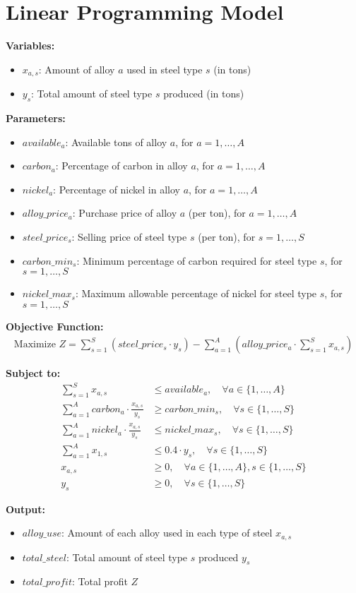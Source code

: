 \documentclass{article}
\begin{document}
\section*{Linear Programming Model}

\textbf{Variables:}
\begin{itemize}
    \item $x_{a,s}$: Amount of alloy $a$ used in steel type $s$ (in tons)
    \item $y_s$: Total amount of steel type $s$ produced (in tons)
\end{itemize}

\textbf{Parameters:}
\begin{itemize}
    \item $available_a$: Available tons of alloy $a$, for $a = 1, \ldots, A$
    \item $carbon_{a}$: Percentage of carbon in alloy $a$, for $a = 1, \ldots, A$
    \item $nickel_{a}$: Percentage of nickel in alloy $a$, for $a = 1, \ldots, A$
    \item $alloy\_price_{a}$: Purchase price of alloy $a$ (per ton), for $a = 1, \ldots, A$
    \item $steel\_price_{s}$: Selling price of steel type $s$ (per ton), for $s = 1, \ldots, S$
    \item $carbon\_min_{s}$: Minimum percentage of carbon required for steel type $s$, for $s = 1, \ldots, S$
    \item $nickel\_max_{s}$: Maximum allowable percentage of nickel for steel type $s$, for $s = 1, \ldots, S$
\end{itemize}

\textbf{Objective Function:}
\begin{align*}
\text{Maximize } Z = \sum_{s=1}^{S} (steel\_price_{s} \cdot y_s) - \sum_{a=1}^{A} (alloy\_price_{a} \cdot \sum_{s=1}^{S} x_{a,s})
\end{align*}

\textbf{Subject to:}
\begin{align}
\sum_{s=1}^{S} x_{a,s} & \leq available_a, \quad \forall a \in \{1, \ldots, A\} \tag{1}\\
\sum_{a=1}^{A} carbon_{a} \cdot \frac{x_{a,s}}{y_s} & \geq carbon\_min_{s}, \quad \forall s \in \{1, \ldots, S\} \tag{2}\\
\sum_{a=1}^{A} nickel_{a} \cdot \frac{x_{a,s}}{y_s} & \leq nickel\_max_{s}, \quad \forall s \in \{1, \ldots, S\} \tag{3}\\
\sum_{a=1}^{A} x_{1,s} & \leq 0.4 \cdot y_s, \quad \forall s \in \{1, \ldots, S\} \tag{4}\\
x_{a,s} & \geq 0, \quad \forall a \in \{1, \ldots, A\}, s \in \{1, \ldots, S\} \tag{5}\\
y_s & \geq 0, \quad \forall s \in \{1, \ldots, S\} \tag{6}
\end{align}

\textbf{Output:}
\begin{itemize}
    \item $alloy\_use$: Amount of each alloy used in each type of steel $x_{a,s}$
    \item $total\_steel$: Total amount of steel type $s$ produced $y_s$
    \item $total\_profit$: Total profit $Z$
\end{itemize}
\end{document}
